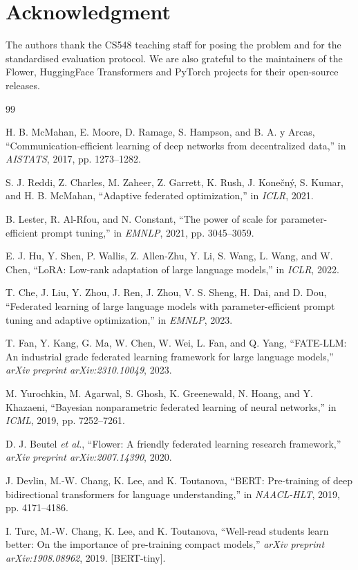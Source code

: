 \documentclass[journal]{IEEEtran}
\begin{document}
\section*{Acknowledgment}
The authors thank the CS548 teaching staff for posing the problem and for
the standardised evaluation protocol. We are also grateful to the
maintainers of the Flower, HuggingFace Transformers and PyTorch projects
for their open-source releases.


\begin{thebibliography}{99}

H. B. McMahan, E. Moore, D. Ramage, S. Hampson, and B. A. y Arcas,
``Communication-efficient learning of deep networks from decentralized
data,'' in \emph{AISTATS}, 2017, pp. 1273--1282.

S. J. Reddi, Z. Charles, M. Zaheer, Z. Garrett, K. Rush, J. Kone\v{c}n\'y,
S. Kumar, and H. B. McMahan, ``Adaptive federated optimization,'' in
\emph{ICLR}, 2021.

B. Lester, R. Al-Rfou, and N. Constant, ``The power of scale for
parameter-efficient prompt tuning,'' in \emph{EMNLP}, 2021,
pp. 3045--3059.

E. J. Hu, Y. Shen, P. Wallis, Z. Allen-Zhu, Y. Li, S. Wang, L. Wang, and
W. Chen, ``LoRA: Low-rank adaptation of large language models,'' in
\emph{ICLR}, 2022.

T. Che, J. Liu, Y. Zhou, J. Ren, J. Zhou, V. S. Sheng, H. Dai, and D. Dou,
``Federated learning of large language models with parameter-efficient
prompt tuning and adaptive optimization,'' in \emph{EMNLP}, 2023.

T. Fan, Y. Kang, G. Ma, W. Chen, W. Wei, L. Fan, and Q. Yang, ``FATE-LLM:
An industrial grade federated learning framework for large language
models,'' \emph{arXiv preprint arXiv:2310.10049}, 2023.

M. Yurochkin, M. Agarwal, S. Ghosh, K. Greenewald, N. Hoang, and
Y. Khazaeni, ``Bayesian nonparametric federated learning of neural
networks,'' in \emph{ICML}, 2019, pp. 7252--7261.

D. J. Beutel \emph{et al.}, ``Flower: A friendly federated learning
research framework,'' \emph{arXiv preprint arXiv:2007.14390}, 2020.

J. Devlin, M.-W. Chang, K. Lee, and K. Toutanova, ``BERT: Pre-training of
deep bidirectional transformers for language understanding,'' in
\emph{NAACL-HLT}, 2019, pp. 4171--4186.

I. Turc, M.-W. Chang, K. Lee, and K. Toutanova, ``Well-read students
learn better: On the importance of pre-training compact models,''
\emph{arXiv preprint arXiv:1908.08962}, 2019. [BERT-tiny].

\end{thebibliography}
\end{document}
